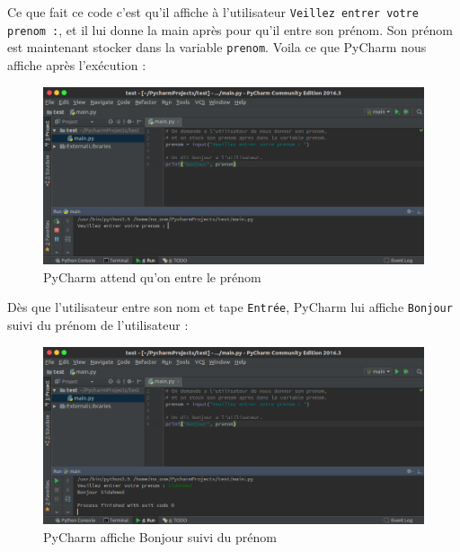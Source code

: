 \documentclass[12pt]{article}
\newcommand{\code}[1]{\colorbox{light-gray}{\texttt{#1}}}
\begin{document}
            Ce que fait ce code c'est qu'il affiche à l'utilisateur \code{Veillez entrer votre prenom :}, et il lui 
            donne la main après pour qu'il entre son prénom. Son prénom est maintenant stocker dans la variable 
            \code{prenom}. Voila ce que PyCharm nous affiche après l'exécution :
            \begin{figure}[H]
                \centering
                \includegraphics[width=\linewidth]{img/16_input.png}
                \caption{PyCharm attend qu'on entre le prénom}
            \end{figure}

            Dès que l'utilisateur entre son nom et tape \code{Entrée}, PyCharm lui affiche \code{Bonjour} suivi 
            du prénom de l'utilisateur :
            \begin{figure}[H]
                \centering
                \includegraphics[width=\linewidth]{img/17_input.png}
                \caption{PyCharm affiche Bonjour suivi du prénom}
            \end{figure}
\end{document}
